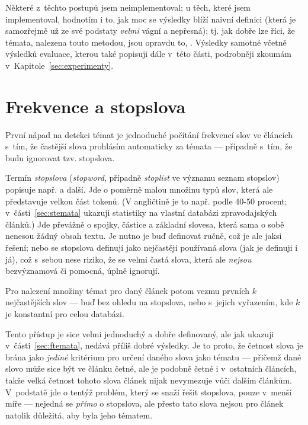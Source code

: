 \documentclass[12pt,a4paper]{report}
\begin{document}
Některé z~těchto postupů jsem neimplementoval; u těch, které jsem implementoval, hodnotím i to, jak moc se výsledky blíží naivní definici (která je samozřejmě už ze své podstaty \emph{velmi} vágní a nepřesná); tj. jak dobře lze říci, že témata, nalezena touto metodou, jsou opravdu to, . Výsledky samotné včetně výsledků evaluace, kterou také popisuji dále v~této části, podrobněji zkoumám v~Kapitole~\ref{sec:experimenty}.

\section{Frekvence a stopslova}
\label{sec:frekvestopslo}

První nápad na detekci témat je jednoduché počítání frekvencí slov ve článcích s~tím, že častější slova prohlásím automaticky za témata --- případně s~tím, že budu ignorovat tzv. stopslova.

Termín \emph{stopslova} (\emph{stopword}, případně \emph{stoplist} ve významu seznam stopslov) popisuje např. \cite{introduction} a další. Jde o po\-mě\-r\-ně ma\-lou mno\-ži\-nu ty\-pů slov, kte\-rá ale před\-sta\-vu\-je vel\-kou část to\-ke\-nů. (V angličtině je to např. po\-dle \cite{introduction} 40-50 pro\-cent; v~části~\ref{sec:stemata} ukazuji statistiky na vlastní databázi zpravodajských článků.) Jde převážně o spojky, částice a zá\-klad\-ní slovesa, která sama o sobě nenesou žádný obsah textu. Je nutno je buď definovat ručně, což je ale jaksi  řešení; nebo se stopslova definují jako nej\-čas\-tě\-ji po\-u\-ží\-va\-ná slo\-va (jak je definuji i já), což s~sebou ne\-se ri\-zi\-ko, že se vel\-mi čas\-tá slo\-va, kte\-rá ale \emph{ne\-jsou} bez\-vý\-zna\-mo\-vá či po\-moc\-ná, ú\-pl\-ně i\-gno\-ru\-jí.

Pro nalezení množiny témat pro daný článek potom vezmu prvních $k$ nej\-ča\-s\-tě\-j\-ších slov --- buď bez ohledu na stopslova, nebo s~jejich vyřazením, kde $k$ je konstantní pro celou databázi.

Tento přístup je sice velmi jednoduchý a dobře definovaný, ale jak ukazuji v~části~\ref{sec:ftemata}, nedává příliš dobré výsledky. Je to proto, že četnost slova je brána jako \emph{jediné} kritérium pro určení daného slova jako tématu --- přičemž dané slovo může sice být ve článku četné, ale je podobně četné i v~ostatních článcích, takže velká četnost tohoto slova článek nijak nevymezuje vůči dalším článkům. V~podstatě jde o tentýž problém, který se snaží řešit stopslova, pouze v~menší míře --- nejedná se \emph{přímo} o stopslova, ale přesto tato slova nejsou pro článek natolik důležitá, aby byla jeho tématem.
\end{document}
